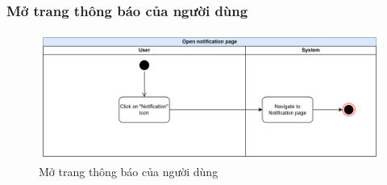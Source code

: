 \subsubsection{Mở trang thông báo của người dùng}
    \begin{figure}[H]
        \centering
        \includegraphics[width=\linewidth]{Content/Phân tích và thiết kế hệ thống/documents/Sơ đồ hoạt động/images/openNotificationPage.png}
        \vspace{0.5cm}
        \caption{Mở trang thông báo của người dùng}
        \label{fig:Mở trang thông báo của người dùng}
    \end{figure}